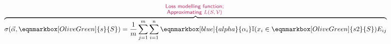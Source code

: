 \documentclass[letterpaper,twocolumn,10pt]{article}
\newcommand{\ind}{\mathbb{I}}
\begin{document}
\begin{equation}
 \overbrace {\sigma({\vec{\alpha}}, \eqnmarkbox[OliveGreen]{s}{S}) = \frac{1}{m} \sum_{j=1}^m \sum_{i=1}^n \eqnmarkbox[blue]{alpha}{\alpha_i} \ind(x_i\in \eqnmarkbox[OliveGreen]{s2}{S}) E_{ij}}^{\substack{\text{\sf \footnotesize \textcolor{purple!85}{Loss modelling function;
	}} \\ \text{\sf \footnotesize \textcolor{purple!85}{Approximating $L(S,\mathcal{V})$
}} } }
\end{equation}

\end{document}
